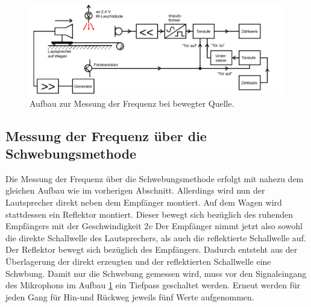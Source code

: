 \begin{figure}
	\includegraphics{Bilder/Frequenz.png}
	\caption{Aufbau zur Messung der Frequenz bei bewegter Quelle. \cite{Anleitung}}
	\label{fig:delphin}
\end{figure}

\subsection{Messung der Frequenz über die Schwebungsmethode}
Die Messung der Frequenz über die Schwebungsmethode erfolgt mit nahezu dem gleichen Aufbau wie im vorherigen Abschnitt.
Allerdings wird nun der Lautsprecher direkt neben dem Empfänger montiert.
Auf dem Wagen wird stattdessen ein Reflektor montiert. Dieser bewegt sich bezüglich des ruhenden Empfängers mit der Geschwindigkeit $2v$
Der Empfänger nimmt jetzt also sowohl die direkte Schallwelle des Lautsprechers, als auch die reflektierte Schallwelle auf.
Der Reflektor bewegt sich bezüglich des Empfängers. Dadurch entsteht aus der Überlagerung der direkt erzeugten und der reflektierten Schallwelle eine Schwbung.
Damit nur die Schwebung gemessen wird, muss vor den Signaleingang des Mikrophons im Aufbau \ref{fig:delphin} ein Tiefpass geschaltet werden.
Erneut werden für jeden Gang für Hin-und Rückweg jeweils fünf Werte aufgenommen.
